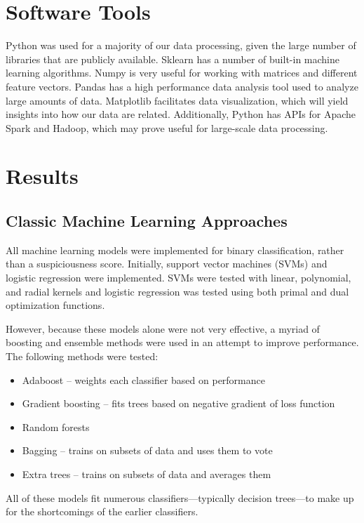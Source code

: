 \documentclass{article} %
\begin{document}
\section{Software Tools}

Python was used for a majority of our data processing, given the large number of libraries that are publicly available.
Sklearn has a number of built-in machine learning algorithms.
Numpy is very useful for working with matrices and different feature vectors.
Pandas has a high performance data analysis tool used to analyze large amounts of data.
Matplotlib facilitates data visualization, which will yield insights into how our data are related.
Additionally, Python has APIs for Apache Spark and Hadoop, which may prove useful for large-scale data processing.

\section{Results}

\subsection{Classic Machine Learning Approaches}

All machine learning models were implemented for binary classification, rather than a suspiciousness score.
Initially, support vector machines (SVMs) and logistic regression were implemented.
SVMs were tested with linear, polynomial, and radial kernels and logistic regression was tested using both primal and dual optimization functions.

However, because these models alone were not very effective, a myriad of boosting and ensemble methods were used in an attempt to improve performance.
The following methods were tested:

\begin{itemize}
\item Adaboost -- weights each classifier based on performance
\item Gradient boosting -- fits trees based on negative gradient of loss function
\item Random forests
\item Bagging -- trains on subsets of data and uses them to vote
\item Extra trees -- trains on subsets of data and averages them
\end{itemize}

All of these models fit numerous classifiers---typically decision trees---to make up for the shortcomings of the earlier classifiers.
\end{document}
